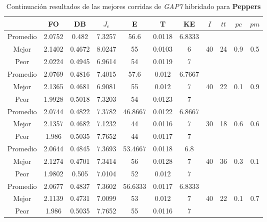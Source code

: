 \begin{table}[h!]
    \footnotesize
    \begin{center}
        \begin{tabular}{|c|c|c|c|c|c|c|c|c|c|c|}
        \hline
             & {\bf FO} & {\bf DB} & $J_e$ & {\bf E} & {\bf T} & {\bf KE} & $I$ & $tt$ & $pc$ & $pm$ \\
        \hline
        \hline
            Promedio  & 2.0752 & 0.482 & 7.3257 & 56.6 & 0.0118 & 6.8333 &  &  &  & \\
            \cline{1-7}
            Mejor & 2.1402 & 0.4672  & 8.0247 & 55 & 0.0103 & 6 & 40 & 24 & 0.9 & 0.5\\
            \cline{1-7}
            Peor & 2.0224 & 0.4945  & 6.9614 & 54 & 0.0119 & 7 &  &  &  & \\
        \hline
        \hline
            Promedio  & 2.0769 & 0.4816 & 7.4015 & 57.6 & 0.012 & 6.7667 &  &  &  & \\
            \cline{1-7}
            Mejor & 2.1365 & 0.4681  & 6.9081 & 55 & 0.012 & 7 & 40 & 22 & 0.1 & 0.9\\
            \cline{1-7}
            Peor & 1.9928 & 0.5018  & 7.3203 & 54 & 0.0123 & 7 &  &  &  & \\
        \hline
        \hline
            Promedio  & 2.0744 & 0.4822 & 7.3782 & 46.8667 & 0.0122 & 6.8667 &  &  &  & \\
            \cline{1-7}
            Mejor & 2.1357 & 0.4682  & 7.1232 & 44 & 0.0116 & 7 & 30 & 18 & 0.6 & 0.6\\
            \cline{1-7}
            Peor & 1.986 & 0.5035  & 7.7652 & 44 & 0.0117 & 7 &  &  &  & \\
        \hline
        \hline
            Promedio  & 2.0644 & 0.4845 & 7.3693 & 53.4667 & 0.0118 & 6.8 &  &  &  & \\
            \cline{1-7}
            Mejor & 2.1274 & 0.4701  & 7.3414 & 56 & 0.0128 & 7 & 40 & 36 & 0.3 & 0.1\\
            \cline{1-7}
            Peor & 1.9802 & 0.505  & 7.0104 & 52 & 0.012 & 7 &  &  &  & \\
        \hline
        \hline
            Promedio  & 2.0677 & 0.4837 & 7.3602 & 56.6333 & 0.0117 & 6.8333 &  &  &  & \\
            \cline{1-7}
            Mejor & 2.1139 & 0.4731  & 7.0099 & 53 & 0.012 & 7 & 40 & 22 & 0.1 & 0.7\\
            \cline{1-7}
            Peor & 1.986 & 0.5035  & 7.7652 & 55 & 0.0116 & 7 &  &  &  & \\
        \hline
        \end{tabular}
        \caption{Continuaci\'on resultados de las mejores corridas de \emph{GAP7} hibridado para {\bf Peppers}}
        \label{tb:tablecGAP7}
    \end{center}
\end{table}
